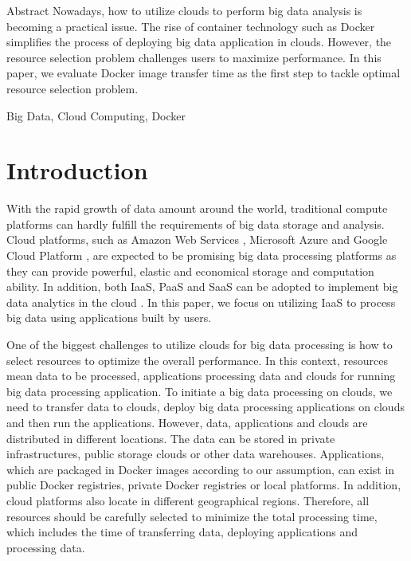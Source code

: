\documentclass{ieicej}
\begin{document}

\begin{eabstract}
Abstract  Nowadays, how to utilize clouds to perform big data analysis is becoming a practical issue. The rise of container technology such as Docker simplifies the process of deploying big data application in clouds. However, the resource selection problem challenges users to maximize performance. In this paper, we evaluate Docker image transfer time as the first step to tackle optimal resource selection problem.
\end{eabstract}
\begin{ekeyword}
Big Data, Cloud Computing, Docker
\end{ekeyword}
\maketitle

\section{Introduction}
With the rapid growth of data amount around the world, traditional compute platforms can hardly fulfill the requirements of big data storage and analysis. Cloud platforms, such as Amazon Web Services \cite{amazon2015aws}, Microsoft Azure \cite{microsoft2015azure} and Google Cloud Platform \cite{google2015cloud}, are expected to be promising big data processing platforms as they can provide powerful, elastic and economical storage and computation ability. In addition, both IaaS, PaaS and SaaS can be adopted to implement big data analytics in the cloud \cite{domenico2013clouds}. In this paper, we focus on utilizing IaaS to process big data using applications built by users.


One of the biggest challenges to utilize clouds for big data processing is how to select resources to optimize the overall performance. In this context, resources mean data to be processed, applications processing data and clouds for running big data processing application. To initiate a big data processing on clouds, we need to transfer data to clouds, deploy big data processing applications on clouds and then run the applications. However, data, applications and clouds are distributed in different locations. The data can be stored in private infrastructures, public storage clouds or other data warehouses. Applications, which are packaged in Docker \cite{docker2015} images according to our assumption, can exist in public Docker registries, private Docker registries or local platforms. In addition, cloud platforms also locate in different geographical regions. Therefore, all resources should be carefully selected to minimize the total processing time, which includes the time of transferring data, deploying applications and processing data.
\end{document}
